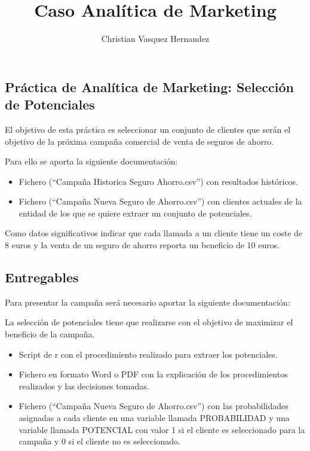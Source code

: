 \documentclass[]{article}
\title{Caso Analítica de Marketing}
\author{Christian Vasquez Hernandez}
\date{}
\providecommand{\tightlist}{%
  \setlength{\itemsep}{0pt}\setlength{\parskip}{0pt}}
\begin{document}
\maketitle

\subsection{Práctica de Analítica de Marketing: Selección de
Potenciales}\label{practica-de-analitica-de-marketing-seleccion-de-potenciales}

El objetivo de esta práctica es seleccionar un conjunto de clientes que
serán el objetivo de la próxima campaña comercial de venta de seguros de
ahorro.

Para ello se aporta la siguiente documentación:

\begin{itemize}
\tightlist
\item
  Fichero (``Campaña Historica Seguro Ahorro.csv'') con resultados
  históricos.
\item
  Fichero (``Campaña Nueva Seguro de Ahorro.csv'') con clientes actuales
  de la entidad de los que se quiere extraer un conjunto de potenciales.
\end{itemize}

Como datos significativos indicar que cada llamada a un cliente tiene un
coste de 8 euros y la venta de un seguro de ahorro reporta un beneficio
de 10 euros.

\subsection{Entregables}\label{entregables}

Para presentar la campaña será necesario aportar la siguiente
documentación:

La selección de potenciales tiene que realizarse con el objetivo de
maximizar el beneficio de la campaña.

\begin{itemize}
\tightlist
\item
  Script de r con el procedimiento realizado para extraer los
  potenciales.
\item
  Fichero en formato Word o PDF con la explicación de los procedimientos
  realizados y las decisiones tomadas.
\item
  Fichero (``Campaña Nueva Seguro de Ahorro.csv'') con las
  probabilidades asignadas a cada cliente en una variable llamada
  PROBABILIDAD y una variable llamada POTENCIAL con valor 1 si el
  cliente es seleccionado para la campaña y 0 si el cliente no es
  seleccionado.
\end{itemize}
\end{document}
